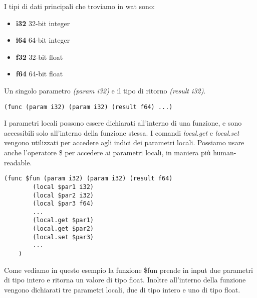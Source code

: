 \documentclass[../../main.tex]{subfiles}
\begin{document}
I tipi di dati principali che troviamo in wat sono:
\begin{itemize}
    \item \textbf{i32} 32-bit integer
    \item \textbf{i64} 64-bit integer
    \item \textbf{f32} 32-bit float
    \item \textbf{f64} 64-bit float
\end{itemize}
Un singolo  parametro \textit{(param i32)} e il tipo di ritorno \textit{(result i32)}.
\begin{lstlisting}[language=WebAssembly, caption={Esempio di funzione in wat}, label={lst:funzioneWat}]
    (func (param i32) (param i32) (result f64) ...)
\end{lstlisting}
I parametri locali possono essere dichiarati all'interno di una funzione, e sono accessibili solo all'interno della funzione stessa.
I comandi \textit{local.get} e \textit{local.set} vengono utilizzati per accedere agli indici dei parametri locali.
Possiamo usare anche l'operatore \$ per accedere ai parametri locali, in maniera più human-readable.
\begin{lstlisting}[language=WebAssembly, caption={Esempio di funzione in wat}, label={lst:funzioneWat}]
    (func $fun (param i32) (param i32) (result f64)
        (local $par1 i32)
        (local $par2 i32)
        (local $par3 f64)
        ...
        (local.get $par1)
        (local.get $par2)
        (local.set $par3)
        ...
    )
\end{lstlisting}
Come vediamo in questo esempio la funzione \$fun prende in input due parametri di tipo intero e ritorna un valore di tipo float. Inoltre all'interno della funzione vengono dichiarati tre parametri locali, due di tipo intero e uno di tipo float.
\end{document}
